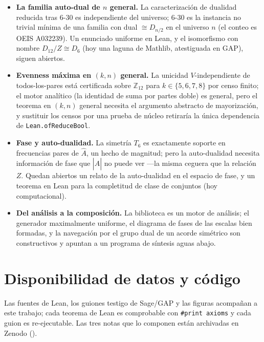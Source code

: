\documentclass[11pt]{article}
\newcommand{\lean}[1]{\texttt{#1}}
\newcommand{\Ztwelve}{\mathbb{Z}_{12}}
\newcommand{\Dgrp}[1]{D_{#1}}
\newcommand{\Ahat}{\hat{A}}
\begin{document}
\begin{itemize}\itemsep2pt
  \item \textbf{La familia auto-dual de $n$ general.} La caracterización de dualidad reducida tras $6$-$30$
        es independiente del universo; $6$-$30$ es la instancia no trivial mínima de una familia con dual
        $\cong\Dgrp{n/2}$ en el universo $n$ (el conteo es OEIS A032239). Un enunciado uniforme en Lean, y
        el isomorfismo con nombre $\Dgrp{12}/Z\cong\Dgrp{6}$ (hoy una laguna de Mathlib, atestiguada en
        GAP), siguen abiertos.
  \item \textbf{Evenness máxima en $(k,n)$ general.} La unicidad $V$-independiente de todos-los-pares está
        certificada sobre $\Ztwelve$ para $k\in\{5,6,7,8\}$ por censo finito; el motor analítico (la
        identidad de suma por partes doble) es general, pero el teorema en $(k,n)$ general necesita el
        argumento abstracto de mayorización, y sustituir los censos por una prueba de núcleo retiraría la
        única dependencia de \lean{Lean.ofReduceBool}.
  \item \textbf{Fase y auto-dualidad.} La simetría $T_6$ es exactamente soporte en frecuencias pares de
        $\Ahat$, un hecho de magnitud; pero la auto-dualidad necesita información de fase que $|\Ahat|$ no
        puede ver ---la misma ceguera que la relación $Z$. Quedan abiertos un relato de la auto-dualidad en
        el espacio de fase, y un teorema en Lean para la completitud de clase de conjuntos (hoy
        computacional).
  \item \textbf{Del análisis a la composición.} La biblioteca es un motor de análisis; el generador
        maximalmente uniforme, el diagrama de fases de las escalas bien formadas, y la navegación por el grupo
        dual de un acorde simétrico son constructivos y apuntan a un programa de síntesis aguas abajo.
\end{itemize}

\section*{Disponibilidad de datos y código}
Las fuentes de Lean, los guiones testigo de Sage/GAP y las figuras acompañan a este trabajo; cada teorema
de Lean es comprobable con \lean{\#print axioms} y cada guion es re-ejecutable. Las tres notas que lo
componen están archivadas en Zenodo (\cite{Note1,Note2,Note3}).
\end{document}
